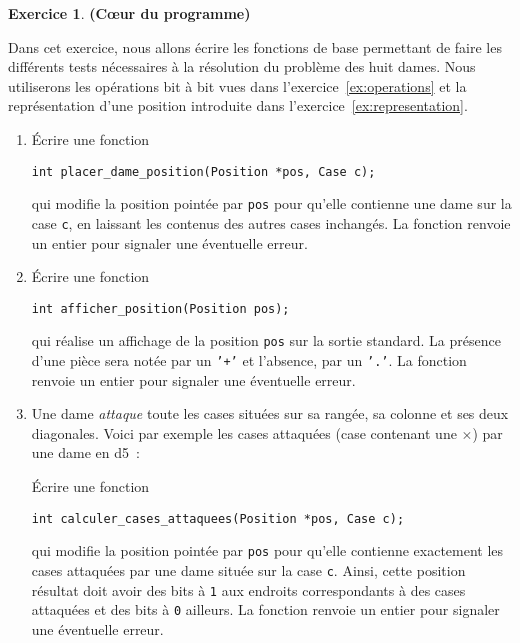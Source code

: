 \documentclass[11pt]{article}
\theoremstyle{definition}
\newtheorem{Exercice}{Exercice}
\begin{document}
\begin{Exercice}{\bf (C\oe ur du programme)}\smallskip

Dans cet exercice, nous allons écrire les fonctions de base permettant
de faire les différents tests nécessaires à la résolution du problème
des huit dames. Nous utiliserons les opérations bit à bit vues dans
l'exercice~\ref{ex:operations} et la représentation d'une position
introduite dans l'exercice~\ref{ex:representation}.
\begin{enumerate}
    \item Écrire une fonction
\begin{lstlisting}
int placer_dame_position(Position *pos, Case c);
\end{lstlisting}
    qui modifie la position pointée par {\tt pos} pour qu'elle contienne
    une dame sur la case {\tt c}, en laissant les contenus des autres
    cases inchangés. La fonction renvoie un entier pour signaler une
    éventuelle erreur.
    \smallskip

    \item Écrire une fonction
\begin{lstlisting}
int afficher_position(Position pos);
\end{lstlisting}
    qui réalise un affichage de la position {\tt pos} sur la sortie
    standard. La présence d'une pièce sera notée par un {\tt '+'} et
    l'absence, par un {\tt '.'}. La fonction renvoie un entier pour
    signaler une éventuelle erreur.
    \smallskip

    \item Une dame {\em attaque} toute les cases situées sur sa rangée,
    sa colonne et ses deux diagonales. Voici par exemple les cases
    attaquées (case contenant une $\times$) par une dame en d5~:
    \begin{center}\showboard\end{center}

    Écrire une fonction
\begin{lstlisting}
int calculer_cases_attaquees(Position *pos, Case c);
\end{lstlisting}
    qui modifie la position pointée par {\tt pos} pour qu'elle contienne
    exactement les cases attaquées par une dame située sur la case
    {\tt c}. Ainsi, cette position résultat doit avoir des bits à {\tt 1}
    aux endroits correspondants à des cases attaquées et des bits à
    {\tt 0} ailleurs. La fonction renvoie un entier pour signaler une
    éventuelle erreur.
    \smallskip


\end{enumerate}
\end{Exercice}
\end{document}
